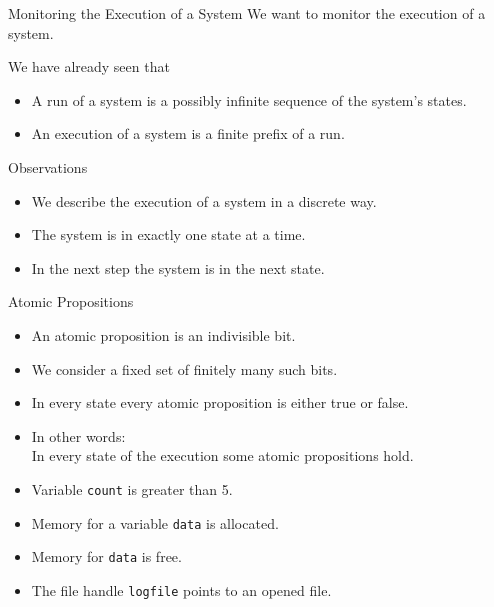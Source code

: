 \begin{Frame}{Monitoring the Execution of a System}
  We want to monitor the \alert{execution of a system}.
  
  \xxx

  We have already seen that
  \begin{itemize}
    \item A \alert{run} of a system is a possibly infinite sequence of the
      system's states.
    \item An \alert{execution} of a system is a \alert{finite prefix} of a run.
  \end{itemize}
  
  \xxx
  
  \begin{Block}{Observations}
    \begin{itemize}
      \item We describe the execution of a system in a \alert{discrete} way.
      \item The system is in exactly one state at a time.
      \item In the next step the system is in the next state.
    \end{itemize}
  \end{Block}
\end{Frame}

\begin{Frame}{Atomic Propositions}
  \begin{itemize}
    \item An atomic proposition is an indivisible bit.
    \item We consider a fixed set of finitely many such bits. 
    \item In every state every atomic proposition is either true or false.
    \item In other words:\\
      In every state of the execution some atomic propositions hold.
  \end{itemize}
  
  \begin{example}
    \begin{itemize}
      \item Variable \texttt{count} is greater than 5.
      \item Memory for a variable \texttt{data} is allocated.
      \item Memory for \texttt{data} is free.
      \item The file handle \texttt{logfile} points to an opened file.
    \end{itemize}
  \end{example}
\end{Frame}

